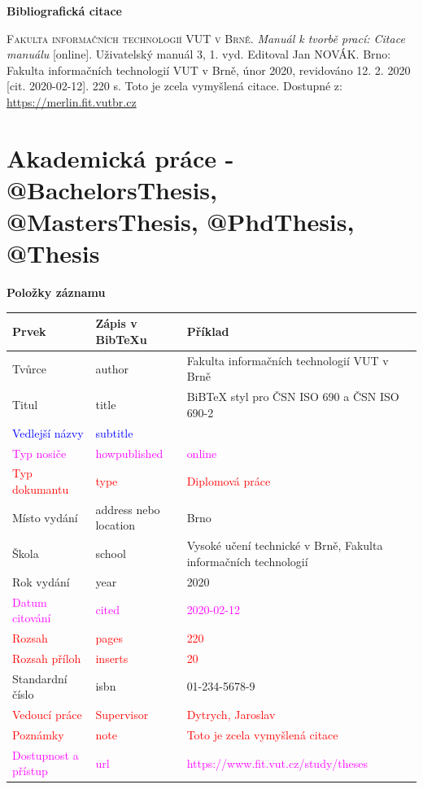 \bigskip

\noindent \textbf{Bibliografická citace}

\medskip

\noindent \textsc{Fakulta informačních technologií VUT v Brně}. \textit{Manuál k tvorbě prací: Citace manuálu} [online]. Uživatelský manuál 3, 1. vyd. Editoval Jan NOVÁK.
Brno: Fakulta informačních technologií VUT v Brně, únor 2020, revidováno 12. 2. 2020 [cit. 2020-02-12]. 220 s. Toto je zcela vymyšlená citace. Dostupné z: \url{https://merlin.fit.vutbr.cz}
\newpage
\section*{Akademická práce - @BachelorsThesis, @MastersThesis, @PhdThesis, @Thesis}
\label{pr-thesis}
\noindent \textbf{Položky záznamu}

\medskip

\begin{tabularx}{\linewidth}{X X X}
    Prvek & Zápis v BibTeXu & Příklad\\\hline
    Tvůrce & author & Fakulta informačních technologií VUT v Brně\\
    Titul & title & BiBTeX styl pro ČSN ISO 690 a ČSN ISO 690-2\\
    \textcolor{blue}{Vedlejší názvy} & \textcolor{blue}{subtitle} & \\
    \textcolor{magenta}{Typ nosiče} & \textcolor{magenta}{howpublished} & \textcolor{magenta}{online}\\
    \textcolor{red}{Typ dokumantu} & \textcolor{red}{type} & \textcolor{red}{Diplomová práce}\\
    Místo vydání & address nebo location & Brno\\
    Škola & school & Vysoké učení technické v Brně, Fakulta informačních technologií\\
    Rok vydání & year & 2020\\
    \textcolor{magenta}{Datum citování} & \textcolor{magenta}{cited} & \textcolor{magenta}{2020-02-12}\\
    \textcolor{red}{Rozsah} & \textcolor{red}{pages} & \textcolor{red}{220}\\
    \textcolor{red}{Rozsah příloh} & \textcolor{red}{inserts} & \textcolor{red}{20}\\
    Standardní číslo & isbn & 01-234-5678-9\\
    \textcolor{red}{Vedoucí práce} & \textcolor{red}{Supervisor} & \textcolor{red}{Dytrych, Jaroslav}\\
    \textcolor{red}{Poznámky} & \textcolor{red}{note} & \textcolor{red}{Toto je zcela vymyšlená citace}\\
    \textcolor{magenta}{Dostupnost a přístup} & \textcolor{magenta}{url} & \textcolor{magenta}{https://www.fit.vut.cz/study/theses}\\
\end{tabularx}

